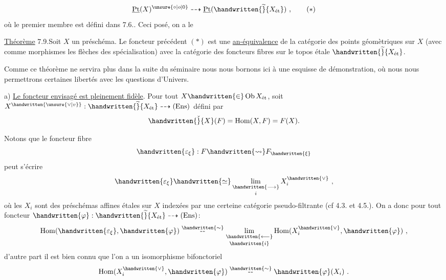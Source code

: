 \begingroup
\makeatletter\tagsleft@true\makeatother
\[
\underline{\mathrm{Pt}}(X)^{\unsure{\circ|o|0}}\dashrightarrow
\underline{\mathrm{Pt}}(\handwritten{\widetilde}{X_{\text{ét}}})\ ,
\tag*{$(*)$}
\]
où le premier membre est défini dans 7.6.. Ceci posé, on a le

\noindent\uline{Théorème} 7.9.\quad Soit $X$ un préschéma. Le foncteur précédent $(*)$ est une \uline{an-équivalence} de la catégorie des points géomètriques sur $X$ (avec comme morphismes les flèches des spécialisation) avec la catégorie des foncteurs fibres sur le topos étale $\handwritten{\widetilde}{X_{\text{ét}}}$.

Comme ce théorème ne servira plus dans la suite du séminaire nous nous bornons ici à une esquisse de démonstration, où nous nous permettrons certaines libertés avec les questions d'Univers.

a) \uline{Le foncteur envisagé est pleinement fidèle}. Pour tout $X\handwritten{\in}\operatorname{Ob} X_{\text{ét}}$, soit $X^{\handwritten{\unsure{\vee|v}}}: \handwritten{\widetilde}{X_{\text{ét}}} \dashrightarrow (\mathrm{Ens})$ défini par
\[
\handwritten{\check}{X}(F) = \operatorname{Hom}(X,F) = F(X).
\]

\noindent Notons que le foncteur fibre
\[
\handwritten{\varepsilon_{\xi}} : F \handwritten{\rightsquigarrow} F_{\handwritten{\xi}}
\]
peut s'écrire
\[
\handwritten{\varepsilon_{\xi}} \handwritten{\simeq} \mathop{\underset{\handwritten{\longrightarrow}}{\mathrm{lim}}}\limits_i X_i^{\handwritten{\vee}}\ ,
\]
où les $X_i$ sont des préschémas affines étales sur $X$ indexées par une certeine catégorie pseudo-filtrante (cf 4.3. et 4.5.). On a donc pour tout foncteur $\handwritten{\varphi}: \handwritten{\widetilde}{X_{\text{ét}}} \dashrightarrow (\mathrm{Ens})$:
\[
\operatorname{Hom}(\handwritten{\varepsilon_{\xi}},\handwritten{\varphi}) \mathrel{\mathop{\text{-\kern.04em-}}\limits^{\handwritten{\sim}}} \mathop{\underset{\handwritten{\longleftarrow}}{\mathrm{lim}}}\limits_{\handwritten{i}} \operatorname{Hom}(X_i^{\handwritten{\vee}},\handwritten{\varphi})\ ,
\]
d'autre part il est bien connu que l'on a un isomorphisme bifonctoriel
\[
\operatorname{Hom}(X_i^{\handwritten{\vee}},\handwritten{\varphi}) \mathrel{\mathop{\text{-\kern.04em-}}\limits^{\handwritten{\sim}}} \handwritten{\varphi}(X_i)\ .
\]

\endgroup

